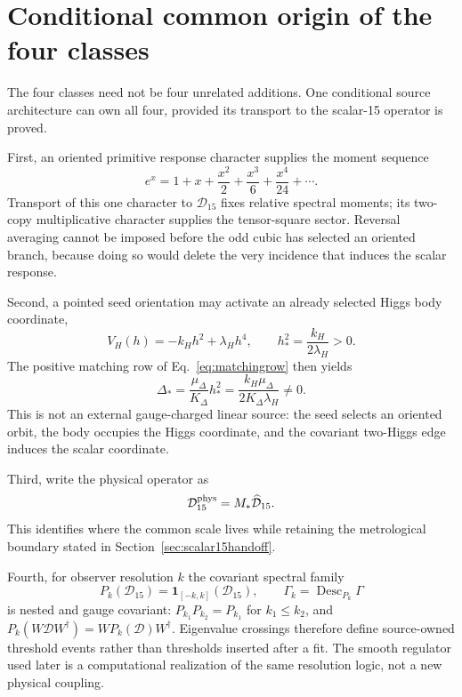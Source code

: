 \section{Conditional common origin of the four classes}
\label{sec:commonorigin}

The four classes need not be four unrelated additions.  One conditional
source architecture can own all four, provided its transport to the
scalar-15 operator is proved.

First, an oriented primitive response character supplies the moment sequence
\begin{equation}
 e^x=1+x+\frac{x^2}{2}+\frac{x^3}{6}+\frac{x^4}{24}+\cdots .
 \label{eq:momentcharacter}
\end{equation}
Transport of this one character to $\mathcal D_{15}$ fixes relative spectral
moments; its two-copy multiplicative character supplies the tensor-square
sector.  Reversal averaging cannot be imposed before the odd cubic has
selected an oriented branch, because doing so would delete the very incidence
that induces the scalar response.

Second, a pointed seed orientation may activate an already selected Higgs
body coordinate,
\begin{equation}
 V_H(h)=-k_Hh^2+\lambda_Hh^4,
 \qquad h_*^2=\frac{k_H}{2\lambda_H}>0.
\end{equation}
The positive matching row of Eq.~\eqref{eq:matchingrow} then yields
\begin{equation}
 \boxed{\Delta_*=\frac{\mu_\Delta}{K_\Delta}h_*^2
 =\frac{k_H\mu_\Delta}{2K_\Delta\lambda_H}\ne0.}
 \label{eq:pointedoccupation}
\end{equation}
This is not an external gauge-charged linear source: the seed selects an
oriented orbit, the body occupies the Higgs coordinate, and the covariant
two-Higgs edge induces the scalar coordinate.

Third, write the physical operator as
\begin{equation}
 \mathcal D_{15}^{\rm phys}=M_*\widehat{\mathcal D}_{15}.
 \label{eq:physicalgap}
\end{equation}
This identifies where the common scale lives while retaining the metrological
boundary stated in Section~\ref{sec:scalar15handoff}.

Fourth, for observer resolution $k$ the covariant spectral family
\begin{equation}
 P_k(\mathcal D_{15})=\mathbf 1_{[-k,k]}(\mathcal D_{15}),
 \qquad
 \Gamma_k=\operatorname{Desc}_{P_k}\Gamma
 \label{eq:spectraldescent}
\end{equation}
is nested and gauge covariant:
$P_{k_1}P_{k_2}=P_{k_1}$ for $k_1\le k_2$, and
$P_k(W\mathcal DW^\dagger)=WP_k(\mathcal D)W^\dagger$.
Eigenvalue crossings therefore define source-owned threshold events rather
than thresholds inserted after a fit.  The smooth regulator used later is a
computational realization of the same resolution logic, not a new physical
coupling.

